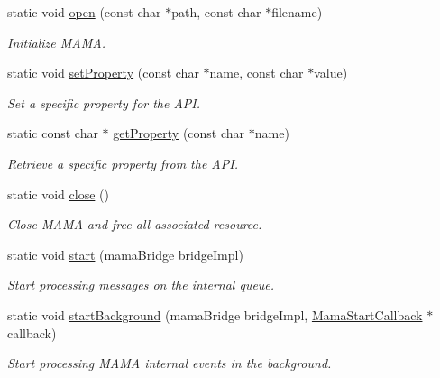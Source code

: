 \begin{DoxyCompactItemize}
static void \hyperlink{classWombat_1_1Mama_a06dbb81b8c854329c37bae4db22d040e}{open} (const char $\ast$path, const char $\ast$filename)
\begin{DoxyCompactList}\small\item\em Initialize MAMA. \item\end{DoxyCompactList}\item 
static void \hyperlink{classWombat_1_1Mama_a696c8766933e24199c71380fa5c2a709}{setProperty} (const char $\ast$name, const char $\ast$value)
\begin{DoxyCompactList}\small\item\em Set a specific property for the API. \item\end{DoxyCompactList}\item 
static const char $\ast$ \hyperlink{classWombat_1_1Mama_ae53b3daafe7452f80406ff5204c99cc6}{getProperty} (const char $\ast$name)
\begin{DoxyCompactList}\small\item\em Retrieve a specific property from the API. \item\end{DoxyCompactList}\item 
static void \hyperlink{classWombat_1_1Mama_aa222cbf76174d7699e8174221832cff4}{close} ()
\begin{DoxyCompactList}\small\item\em Close MAMA and free all associated resource. \item\end{DoxyCompactList}\item 
static void \hyperlink{classWombat_1_1Mama_a826ec494ed4cd1f9b8ac1baa8ca5af30}{start} (mamaBridge bridgeImpl)
\begin{DoxyCompactList}\small\item\em Start processing messages on the internal queue. \item\end{DoxyCompactList}\item 
static void \hyperlink{classWombat_1_1Mama_a3fe589a62f5cd705944b8ea6215b4aa3}{startBackground} (mamaBridge bridgeImpl, \hyperlink{classWombat_1_1MamaStartCallback}{MamaStartCallback} $\ast$callback)
\begin{DoxyCompactList}\small\item\em Start processing MAMA internal events in the background. \item\end{DoxyCompactList}\item 

\end{DoxyCompactItemize}
